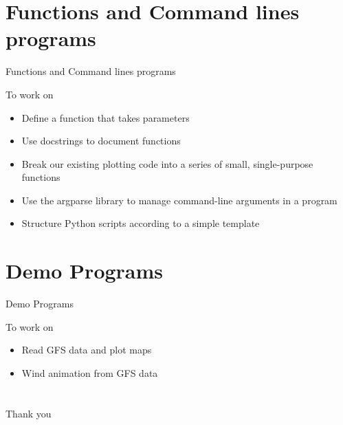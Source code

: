 \section[Functions and Command lines programs]{Functions and Command lines programs}

\begin{frame}{Functions and Command lines programs}
	\begin{beamerboxesrounded}{To work on}
		\begin{itemize}
			\item Define a function that takes parameters
			\item Use docstrings to document functions
			\item Break our existing plotting code into a series of small, single-purpose functions
			\item Use the argparse library to manage command-line arguments in a program
			\item Structure Python scripts according to a simple template
		\end{itemize}
	\end{beamerboxesrounded}
\end{frame}

\section[Demo Programs]{Demo Programs}

\begin{frame}{Demo Programs}
	\begin{beamerboxesrounded}{To work on}
		\begin{itemize}
			\item Read GFS data and plot maps
			\item Wind animation from GFS data
		\end{itemize}
	\end{beamerboxesrounded}
\end{frame}


\section[]{}

\begin{frame}{}
	\Large
	
	Thank you
	
\end{frame}   